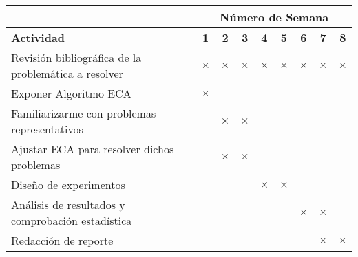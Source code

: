 \documentclass[12pt,letterpaper, xcolor=table, x11names]{article}
\newcommand{\tache}{$\boldsymbol{\times}$}
\begin{document}
\begin{center}
	
\hspace{-1.0cm}
\begin{tabular}{|l|c|c|c|c|c|c|c|c|}
\hline \rowcolor{gray}
% 
&\multicolumn{8}{c}{\bf Número de Semana}\\ \hline
% 
{\bf Actividad } 
&{\bf 1}&{\bf 2}&{\bf 3}&{\bf 4} &{\bf 5}&{\bf 6}&{\bf 7}&{\bf 8} \\ \hline
Revisión bibliográfica de la problemática a resolver
& \tache  & \tache & \tache & \tache  & \tache & \tache & \tache & \tache \\ \hline
Exponer Algoritmo ECA
& \tache  &        &        &         &        &        &        &        \\ \hline
Familiarizarme con problemas representativos  
&         & \tache & \tache  &        &        &        &        &        \\ \hline
Ajustar ECA para resolver dichos problemas
&          & \tache & \tache &        &        &        &        &        \\ \hline
Diseño de experimentos
&          &        &        & \tache & \tache &        &        &        \\ \hline
Análisis de resultados y comprobación estadística
&          &        &        &        &        & \tache & \tache &        \\ \hline
Redacción de reporte
&          &        &        &        &        &        & \tache & \tache \\ \hline
\end{tabular}
\end{center}
\end{document}

